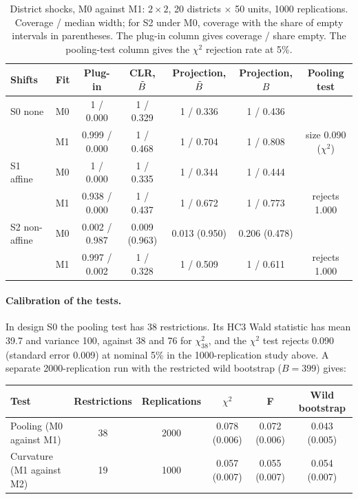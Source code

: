 \begin{table}[t]
\centering\footnotesize
\setlength{\tabcolsep}{3pt}
\begin{tabular}{@{}llccccc@{}}
\toprule
Shifts & Fit & Plug-in & CLR, $\tilde B$ & Projection, $\tilde B$ & Projection, $B$ & Pooling test \\
\midrule
S0 none & M0 & 1 / 0.000 & 1 / 0.329 & 1 / 0.336 & 1 / 0.436 & \\
 & M1 & 0.999 / 0.000 & 1 / 0.468 & 1 / 0.704 & 1 / 0.808 & size 0.090 ($\chi^2$) \\
S1 affine & M0 & 1 / 0.000 & 1 / 0.335 & 1 / 0.344 & 1 / 0.444 & \\
 & M1 & 0.938 / 0.000 & 1 / 0.437 & 1 / 0.672 & 1 / 0.773 & rejects 1.000 \\
S2 non-affine & M0 & 0.002 / 0.987 & 0.009 (0.963) & 0.013 (0.950) & 0.206 (0.478) & \\
 & M1 & 0.997 / 0.002 & 1 / 0.328 & 1 / 0.509 & 1 / 0.611 & rejects 1.000 \\
\bottomrule
\end{tabular}
\caption{District shocks, M0 against M1: $2\times2$, 20 districts $\times$ 50 units, 1000 replications. Coverage / median width; for S2 under M0, coverage with the share of empty intervals in parentheses. The plug-in column gives coverage / share empty. The pooling-test column gives the $\chi^2$ rejection rate at 5\%.}\label{tab:shocks}
\end{table}

\paragraph{Calibration of the tests.} In design S0 the pooling test has 38
restrictions. Its HC3 Wald statistic has mean 39.7 and variance 100, against 38 and
76 for $\chi^2_{38}$, and the $\chi^2$ test rejects 0.090 (standard error 0.009) at
nominal 5\% in the 1000-replication study above. A separate 2000-replication run
with the restricted wild bootstrap ($B=399$) gives:

\begin{center}\small
\begin{tabular}{@{}lccccc@{}}
\toprule
Test & Restrictions & Replications & $\chi^2$ & F & Wild bootstrap \\
\midrule
Pooling (M0 against M1) & 38 & 2000 & 0.078 (0.006) & 0.072 (0.006) & 0.043 (0.005) \\
Curvature (M1 against M2) & 19 & 1000 & 0.057 (0.007) & 0.055 (0.007) & 0.054 (0.007) \\
\bottomrule
\end{tabular}
\end{center}

